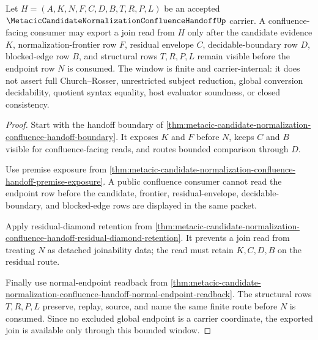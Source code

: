 \begin{theorem}
\label{thm:metacic-candidate-normalization-confluence-bounded-join-window}
Let $H=(A,K,N,F,C,D,B,T,R,P,L)$ be an accepted $\MetacicCandidateNormalizationConfluenceHandoffUp$ carrier. A confluence-facing consumer may export a join read from $H$ only after the candidate evidence $K$, normalization-frontier row $F$, residual envelope $C$, decidable-boundary row $D$, blocked-edge row $B$, and structural rows $T,R,P,L$ remain visible before the endpoint row $N$ is consumed. The window is finite and carrier-internal: it does not assert full Church--Rosser, unrestricted subject reduction, global conversion decidability, quotient syntax equality, host evaluator soundness, or closed consistency.
\end{theorem}
\begin{proof}
Start with the handoff boundary of \autoref{thm:metacic-candidate-normalization-confluence-handoff-boundary}. It exposes $K$ and $F$ before $N$, keeps $C$ and $B$ visible for confluence-facing reads, and routes bounded comparison through $D$.

Use premise exposure from \autoref{thm:metacic-candidate-normalization-confluence-handoff-premise-exposure}. A public confluence consumer cannot read the endpoint row before the candidate, frontier, residual-envelope, decidable-boundary, and blocked-edge rows are displayed in the same packet.

Apply residual-diamond retention from \autoref{thm:metacic-candidate-normalization-confluence-handoff-residual-diamond-retention}. It prevents a join read from treating $N$ as detached joinability data; the read must retain $K,C,D,B$ on the residual route.

Finally use normal-endpoint readback from \autoref{thm:metacic-candidate-normalization-confluence-handoff-normal-endpoint-readback}. The structural rows $T,R,P,L$ preserve, replay, source, and name the same finite route before $N$ is consumed. Since no excluded global endpoint is a carrier coordinate, the exported join is available only through this bounded window.
\end{proof}

